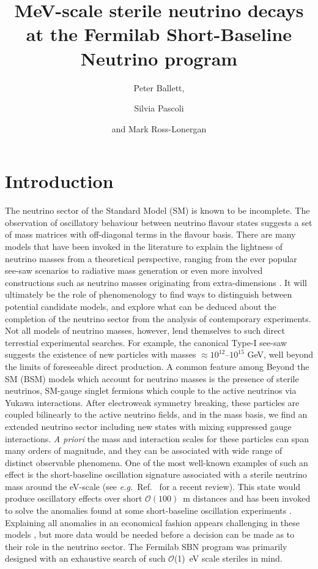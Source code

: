 \documentclass[11pt, a4paper]{article}
\title{MeV-scale sterile neutrino decays at the Fermilab Short-Baseline Neutrino program}
\author{Peter Ballett,}
\author{Silvia Pascoli}
\author{and Mark Ross-Lonergan}
\affiliation{Institute for Particle Physics Phenomenology, Department of
Physics, Durham University, South Road, Durham DH1 3LE, United Kingdom}
\newcommand{\refref}[1]{Ref.~\cite{#1}}
\def\eg{\emph{e.g.}}
\begin{document}
 

\maketitle

\section{Introduction}

The neutrino sector of the Standard Model (SM) is known to be incomplete. The
observation of oscillatory behaviour between neutrino flavour states
\cite{Fukuda:1998mi} suggests a set of mass matrices with off-diagonal terms in
the flavour basis. There are many models that have been invoked in the
literature to explain the lightness of neutrino masses from a theoretical
perspective, ranging from the ever popular see-saw scenarios
\cite{Minkowski:1977sc, GellMann:1980vs, Mohapatra:1979ia} to radiative mass
generation \cite{Zee:1980ai,Babu:1988ki} or even more involved constructions
such as neutrino masses originating from extra-dimensions
\cite{ArkaniHamed:1998vp}.  It will ultimately be the role of phenomenology to
find ways to distinguish between potential candidate models, and explore what
can be deduced about the completion of the neutrino sector from the analysis of
contemporary experiments.
%
Not all models of neutrino masses, however, lend themselves to such direct
terrestial experimental searches. For example, the canonical Type-I see-saw
\cite{Minkowski:1977sc, GellMann:1980vs, Mohapatra:1979ia} suggests the
existence of new particles with masses  $\approx 10^{12}$--$10^{15}$ GeV, well
beyond the limits of foreseeable direct production. A common feature among
Beyond the SM (BSM) models which account for neutrino masses is the presence of
sterile neutrinos, SM-gauge singlet fermions which couple to the active
neutrinos via Yukawa interactions. After electroweak symmetry breaking, these
particles are coupled bilinearly to the active neutrino fields, and in the mass
basis, we find an extended neutrino sector including new states with mixing
suppressed gauge interactions. \emph{A priori} the mass and interaction scales
for these particles can span many orders of magnitude, and they can be
associated with wide range of distinct observable phenomena. 
%
One of the most well-known examples of such an effect is the short-baseline
oscillation signature associated with a sterile neutrino mass around the
eV-scale (see \eg\ \refref{Gariazzo:2015rra} for a recent review). This state
would produce oscillatory effects over short $\mathcal{O}(100)$~m distances and
has been invoked to solve the anomalies found at some short-baseline
oscillation experiments \cite{Aguilar:2001ty, Aguilar-Arevalo:2013pmq,
AguilarArevalo:2008rc}.  Explaining all anomalies in an economical fashion
appears challenging in these models \cite{Kopp:2013vaa,Conrad:2012qt}, but more
data would be needed before a decision can be made as to their role in the
neutrino sector. The Fermilab SBN \cite{Antonello:2015lea} program was
primarily designed with an exhaustive search of such $\mathcal{O}$(1)~eV scale
steriles in mind.
\end{document}

